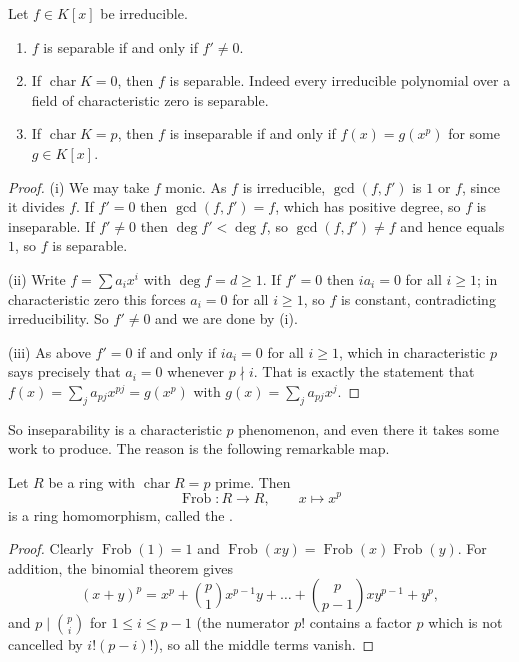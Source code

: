 \documentclass[a4paper]{scrartcl}
\newcommand{\charr}{\operatorname{char}}
\newcommand{\Frob}{\operatorname{Frob}}
\begin{document}
\begin{proposition}\label{prop:sepcrit}
	Let $f \in K[x]$ be irreducible.
	\begin{enumerate}[label=(\roman*)]
		\item $f$ is separable if and only if $f' \neq 0$.
		\item If $\charr K = 0$, then $f$ is separable. Indeed every irreducible polynomial over a field of characteristic zero is separable.
		\item If $\charr K = p$, then $f$ is inseparable if and only if $f(x) = g(x^p)$ for some $g \in K[x]$.
	\end{enumerate}
\end{proposition}

\begin{proof}
	(i) We may take $f$ monic. As $f$ is irreducible, $\gcd(f,f')$ is $1$ or $f$, since it divides $f$. If $f' = 0$ then $\gcd(f,f') = f$, which has positive degree, so $f$ is inseparable. If $f' \neq 0$ then $\deg f' < \deg f$, so $\gcd(f,f') \neq f$ and hence equals $1$, so $f$ is separable.

	(ii) Write $f = \sum a_i x^i$ with $\deg f = d \geq 1$. If $f' = 0$ then $ia_i = 0$ for all $i \geq 1$; in characteristic zero this forces $a_i = 0$ for all $i \geq 1$, so $f$ is constant, contradicting irreducibility. So $f' \neq 0$ and we are done by (i).

	(iii) As above $f' = 0$ if and only if $ia_i = 0$ for all $i \geq 1$, which in characteristic $p$ says precisely that $a_i = 0$ whenever $p \nmid i$. That is exactly the statement that $f(x) = \sum_j a_{pj}x^{pj} = g(x^p)$ with $g(x) = \sum_j a_{pj}x^j$.
\end{proof}

So inseparability is a characteristic $p$ phenomenon, and even there it takes some work to produce. The reason is the following remarkable map.

\begin{proposition}[Frobenius]\label{prop:frob}
	Let $R$ be a ring with $\charr R = p$ prime. Then
	$$\Frob : R \to R, \qquad x \mapsto x^p$$
	is a ring homomorphism, called the .
\end{proposition}

\begin{proof}
	Clearly $\Frob(1) = 1$ and $\Frob(xy) = \Frob(x)\Frob(y)$. For addition, the binomial theorem gives
	$$(x+y)^p = x^p + \binom{p}{1}x^{p-1}y + \dots + \binom{p}{p-1}xy^{p-1} + y^p,$$
	and $p \mid \binom{p}{i}$ for $1 \leq i \leq p-1$ (the numerator $p!$ contains a factor $p$ which is not cancelled by $i!(p-i)!$), so all the middle terms vanish.
\end{proof}
\end{document}
